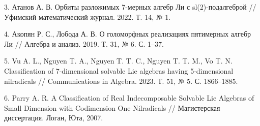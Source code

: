 \documentclass[12pt]{article}
\begin{document}
3. Атанов А. В. Орбиты разложимых 7-мерных алгебр Ли с sl(2)-подалгеброй // Уфимский математический журнал. 2022. Т. 14, № 1.

4. Акопян Р. С., Лобода А. В. О голоморфных реализациях пятимерных алгебр Ли // Алгебра и анализ. 2019. Т. 31, № 6. С. 1–37. 

5. Vu A. L., Nguyen T. A., Nguyen T. T. C., Nguyen T. T. M., Vo T. N. Classification of 7-dimensional solvable Lie algebras having 5-dimensional nilradicals // Communications in Algebra. 2023. Т. 51, № 5. С. 1866–1885.

6. Parry A. R. A Classification of Real Indecomposable Solvable Lie Algebras of Small Dimension with Codimension One Nilradicals // Магистерская диссертация. Логан, Юта, 2007.
\end{document}
